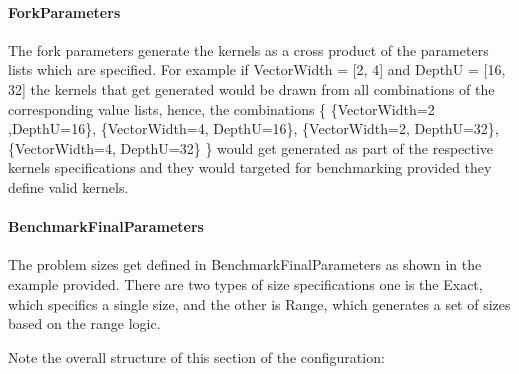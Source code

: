 \documentclass[]{article}
\begin{document}
\label{sec:forkParams}
\paragraph{ForkParameters} The fork parameters generate the kernels as a cross product of the parameters lists which are specified. For example if VectorWidth = [2, 4] and DepthU = [16, 32] the kernels that get generated would be drawn from all combinations of the corresponding value lists, hence, the combinations \{ \{VectorWidth=2 ,DepthU=16\}, \{VectorWidth=4, DepthU=16\},  \{VectorWidth=2, DepthU=32\}, \{VectorWidth=4, DepthU=32\} \} would get generated as part of the respective kernels specifications and they would targeted for benchmarking provided they define valid kernels. 

\paragraph{BenchmarkFinalParameters} The problem sizes get defined in BenchmarkFinalParameters as shown in the example provided. There are two types of size specifications one is the Exact, which specifics a single size, and the other is Range, which generates a set of sizes based on the range logic. 

\hfill \break
Note the overall structure of this section of the configuration:

\hfill \break
{}






\end{document}

